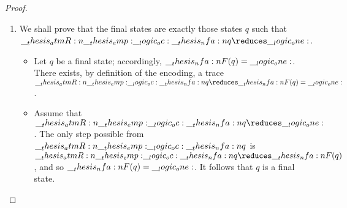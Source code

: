 \begin{proof}
\begin{enumerate}[parsep=0em, listparindent=\parindent]
    \noindent
    Additionally, we would like to prove an apparently stronger statement: $q \asim\nfareduces[a]\asim q'$ if, and only if, $\atmR{a} \oc \nfa{q} \osim\reduces\osim \nfa{q}'$.
    From the above proof involving finite words, we know that $q \asim\nfareduces[a]\asim q'$ if, and only if, $\atmR{a} \oc \nfa{q} \osim\Reduces\osim \nfa{q}'$.
    Therefore, it suffices to show that the multi-step $\atmR{a} \oc \nfa{q} \osim\Reduces\osim \nfa{q}'$ is equivalent to the single-step $\atmR{a} \oc \nfa{q} \osim\reduces\osim \nfa{q}'$.
    \begin{itemize}
    \item 
      To prove the left-to-right direction, begin with the multi-step assumption that $\atmR{a} \oc \nfa{q} \osim\Reduces\osim \nfa{q}'$.
      Because rewriting bisimilarity is reduction-closed (\cref{thm:bisim-reduction-closure}) and transitive (\cref{??}), $\atmR{a} \oc \nfa{q} \Reduces\osim \nfa{q}'$.
      By \cref{lem:a-succ-bisim}, there exists a state $q'_a$ that $a$-succeeds $q$ such that
      $\nfa{q}'_a \osim \nfa{q}'$.
      Then, by definition of the encoding (and reflexivity of rewriting bisimilarity (\cref{??})), it follows that $\atmR{a} \oc \nfa{q} \osim\reduces\osim \nfa{q}'$, as required.
    \item
      The right-to-left direction is trivial because a single step is a particular form of trace.
    \end{itemize}

  \item
    We shall prove that the final states are exactly those states $q$ such that $\atmR{\emp} \oc \nfa{q} \reduces \one$.
    \begin{itemize}
    \item
      Let $q$ be a final state; accordingly, $\__thesis_nfa:n {F}(q) = \__logic_one:$.
      There exists, by definition of the encoding, a trace $\atmR{\emp} \oc \nfa{q} \reduces \nfa{F}(q) = \one$.
    \item
      Assume that $\atmR{\emp} \oc \nfa{q} \reduces \one$.
      The only step possible from $\__thesis_atmR:n {\__thesis_emp:} \__logic_oc: \__thesis_nfa:n {q}$ is $\atmR{\emp} \oc \nfa{q} \reduces \nfa{F}(q)$, and so $\__thesis_nfa:n {F}(q) = \__logic_one:$.
      It follows that $q$ is a final state.
    \qedhere
    \end{itemize}


\end{enumerate}
\end{proof}
